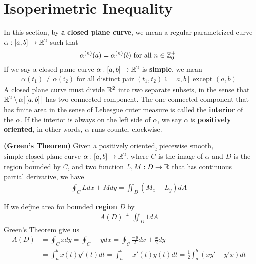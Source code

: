 \documentclass{report}
\begin{document}
\section{Isoperimetric Inequality}
\begin{mdframed}
In this section, by \textbf{a closed plane curve}, we mean a regular parametrized curve $\alpha :[a,b]\rightarrow \mathbb{R}^2$ such that 
\begin{align*}
\alpha^{(n)}(a)=\alpha^{(n)}(b)\text{ for all $n\in\mathbb{Z}_0^+$ }
\end{align*}
If we say a closed plane curve $\alpha :[a,b]\rightarrow \mathbb{R}^2$ is \textbf{simple}, we mean 
\begin{align*}
\alpha (t_1)\neq \alpha (t_2)\text{ for all distinct pair $(t_1,t_2) \subseteq [a,b]$ except $(a,b)$}
\end{align*}
A closed plane curve must divide $\mathbb{R}^2$ into two separate subsets, in the sense that  $\mathbb{R}^2 \setminus \alpha \big[[a,b] \big]$ has two connected component. The one connected component that has finite area in the sense of Lebesgue outer measure is called the \textbf{interior} of the $\alpha $. If the interior is always on the left side of $\alpha $, we say $\alpha $ is \textbf{positively oriented}, in other words, $\alpha $ runs counter clockwise.
\end{mdframed}
\begin{theorem}
\textbf{(Green's Theorem)} Given a  $\underline{\text{positively oriented, piecewise smooth,}}$\\ $\underline{\text{simple closed plane}}$ curve $\alpha :[a,b]\rightarrow \mathbb{R}^2$, where $C$ is the image of $\alpha $  and $D$ is the region bounded by $C$, and two function  $L,M:D\rightarrow \mathbb{R}$ that has continuous partial derivative, we have 
\begin{align*}
\oint_C L dx+Mdy =\iint_D (M_x-L_y) dA
\end{align*}
\end{theorem}
\begin{mdframed}
If we $\underline{\text{define}}$ area for bounded \textbf{region} $D$ by 
\begin{align*}
A(D)\triangleq \iint_D 1dA
\end{align*}
Green's Theorem give us 
\begin{align*}
  A(D)&=\oint_C xdy =\oint_C -ydx =\oint_C \frac{-y}{2}dx+\frac{x}{2}dy\\
  &=\int_a^b x(t)y'(t)dt=\int_a^b -x'(t)y(t)dt =\frac{1}{2}\int_a^b (xy'-y'x)dt
\end{align*}
\end{mdframed}
\end{document}
